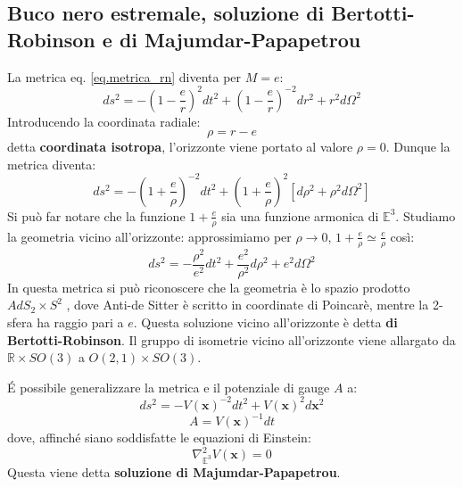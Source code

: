\subsection{Buco nero estremale, soluzione di Bertotti-Robinson e di Majumdar-Papapetrou}
La metrica eq. \ref{eq.metrica_rn} diventa per $M=e$:
\begin{equation*}
    ds^2 = - \left(1 - \frac{e}{r} \right)^2dt^2 + \left(1 - \frac{e}{r} \right)^{-2}dr^2 + r^2 d\Omega^2
\end{equation*}
Introducendo la coordinata radiale:
\begin{equation*}
    \rho = r - e
\end{equation*}
detta \textbf{coordinata isotropa}, l'orizzonte viene portato al valore $\rho = 0$. Dunque la metrica diventa:
\begin{equation}
    ds^2 = - \left( 1 + \frac{e}{\rho}\right)^{-2}dt^2 +  \left( 1 + \frac{e}{\rho}\right)^2\left[ d\rho^2 + \rho^2 d\Omega^2\right]
    \label{eq.metrica_rn_estremale_isot}
\end{equation}
Si può far notare che la funzione $1 + \frac{e}{\rho}$ sia una funzione armonica di $\mathbb{E}^3$.
Studiamo la geometria vicino all'orizzonte: approssimiamo per $\rho \rightarrow 0$, $1 + \frac{e}{\rho} \simeq \frac{e}{\rho}$ così:
\begin{equation*}
    ds^2 = - \frac{\rho^2}{e^2}dt^2 + \frac{e^2}{\rho^2}d\rho^2 + e^2 d\Omega^2
\end{equation*}
In questa metrica si può riconoscere che la geometria è lo spazio prodotto $AdS_2 \times S^2$ , dove Anti-de Sitter è scritto in coordinate di Poincarè, mentre la 2-sfera ha raggio pari a $e$. Questa soluzione vicino all'orizzonte è detta \textbf{di Bertotti-Robinson}. Il gruppo di isometrie vicino all'orizzonte viene allargato da $\mathbb{R}\times SO(3)$ a $O(2,1)\times SO(3)$.

\'E possibile generalizzare la metrica e il potenziale di gauge $A$ a:
\begin{equation*}
        ds^2 = - V(\bm{x})^{-2}dt^2 + V(\bm{x})^2 d\bm{x}^2
\end{equation*}
\begin{equation*}
        A = V(\bm{x})^{-1}dt
\end{equation*}
dove, affinché siano soddisfatte le equazioni di Einstein:
\begin{equation*}
    \nabla^2_{\mathbb{E}^3} V(\bm{x}) = 0
\end{equation*}
Questa viene detta \textbf{soluzione di Majumdar-Papapetrou}.

